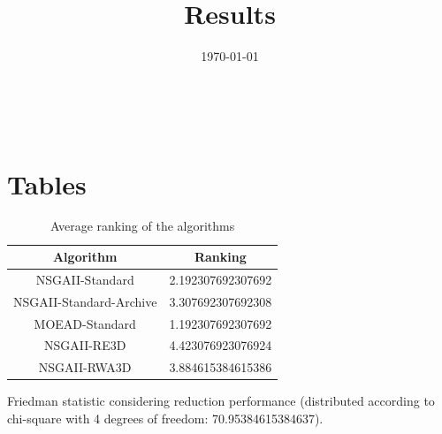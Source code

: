 \documentclass{article}
\title{Results}
\author{}
\date{\today}
\begin{document}
\oddsidemargin 0in \topmargin 0in\maketitle
\
\section{Tables}
\begin{table}[!htp]
\centering
\caption{Average ranking of the algorithms}
\begin{tabular}{c|c}
Algorithm&Ranking\\
\hline
NSGAII-Standard&2.192307692307692\\
NSGAII-Standard-Archive&3.307692307692308\\
MOEAD-Standard&1.192307692307692\\
NSGAII-RE3D&4.423076923076924\\
NSGAII-RWA3D&3.884615384615386\\
\end{tabular}
\end{table}


Friedman statistic considering reduction performance (distributed according to chi-square with 4 degrees of freedom: 70.95384615384637).
\end{document}
